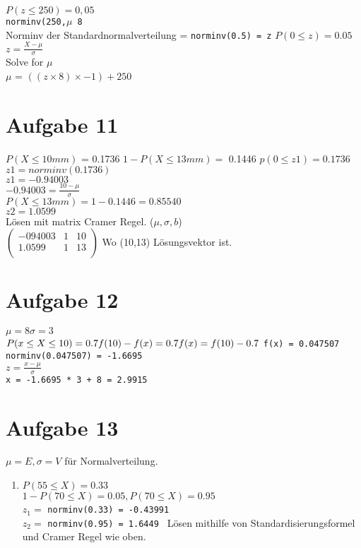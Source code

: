 \documentclass[a4paper,10pt]{scrbook}
\begin{document}
$ P(z \leq 250) = 0,05$ \\
\texttt{norminv(250,$\mu$ 8}\\
Norminv der Standardnormalverteilung = \texttt{norminv(0.5) = z}
$P(0 \leq z) = 0.05$\\
$ z = \frac{X-\mu}{\sigma}$ \\
Solve for $\mu$ \\
$\mu$ = $((z \times 8) \times -1 )+ 250$ 

\section*{Aufgabe 11}
$P(X \leq 10mm)$ = 0.1736 
$1-P(X\leq 13mm) =$ 0.1446
$p(0 \leq z1) = 0.1736$\\
$z1 = norminv(0.1736)$ \\
$z1 = -0.94003$ \\
$ -0.94003 = \frac{10-\mu}{\sigma}$ \\
$ P(X \leq 13mm) = 1-0.1446 = 0.85540$ \\
$ z2 = 1.0599$ \\

Lösen mit matrix  Cramer Regel. ($\mu,\sigma,b$)\\
$\begin{pmatrix}
   -094003 & 1 & 10\\
   1.0599 & 1 & 13 \\
 \end{pmatrix}$
Wo (10,13) Lösungsvektor ist.


\section*{Aufgabe 12}
$ \mu = 8 \sigma = 3$ \\
$ P(x\leq X \leq 10) = 0.7 \\
f(10) - f(x) = 0.7 \\
f(x) = f(10) - 0.7 \\$
\texttt{f(x) = 0.047507 \\
norminv(0.047507) = -1.6695 }\\
$ z = \frac{x - \mu}{\sigma}$\\
\texttt{x = -1.6695 * 3 + 8 = 2.9915}

\section*{Aufgabe 13}
$\mu = E , \sigma = V $ für Normalverteilung.\\
\begin{enumerate}
 \item $P(55 \leq X) = 0.33$ \\
 $1-P(70 \leq X) = 0.05, P (70 \leq X) = 0.95$\\
 $z_1 = $ \texttt{norminv(0.33) = -0.43991}\\
 $z_2 =$ \texttt{norminv(0.95) = 1.6449 }
 Lösen mithilfe von Standardisierungsformel und Cramer Regel wie oben.
\end{enumerate}
\end{document}
